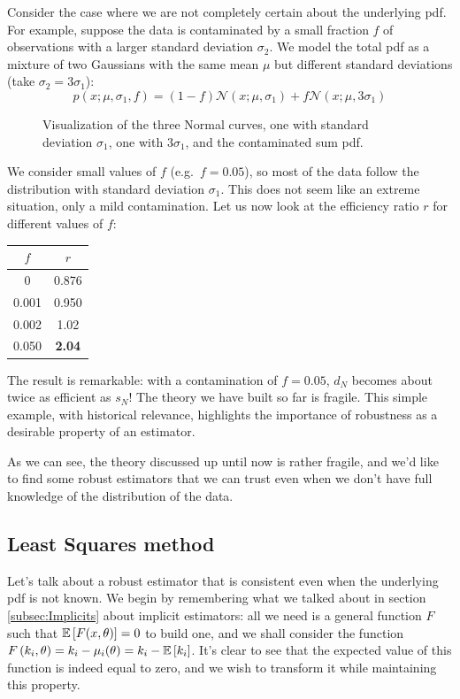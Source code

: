 \begin{example}
	Consider the case where we are not completely certain about the underlying pdf. For example, suppose the data is contaminated by a small fraction $f$ of observations with a larger standard deviation $\sigma_2$.
	We model the total pdf as a mixture of two Gaussians with the same mean $\mu$ but different standard deviations (take $\sigma_2 = 3\sigma_1$):
	\[
	p(x; \mu, \sigma_1, f) = (1-f)\mathcal{N}(x;\mu,\sigma_1) + f\mathcal{N}(x;\mu, 3\sigma_1)
	\]
	\begin{figure}[H]
		\centering
		
		\caption{Visualization of the three Normal curves, one with standard deviation $\sigma_1$, one with $3\sigma_1$, and the contaminated sum pdf.}
	\end{figure}
	We consider small values of $f$ (e.g.\ $f=0.05$), so most of the data follow the distribution with standard deviation $\sigma_1$. This does not seem like an extreme situation, only a mild contamination. Let us now look at the efficiency ratio $r$ for different values of $f$:
	\begin{center}
	\begin{tabular}{||c|c||}
		\hline
		$f$ & $r$ \\
		\hline
		0 & 0.876 \\
		\hline
		0.001 & 0.950\\
		\hline
		0.002 & 1.02\\
		\hline
		0.050 & \textbf{2.04}\\
		\hline
	\end{tabular}
	\end{center}
	The result is remarkable: with a contamination of $f=0.05$, $d_N$ becomes about twice as efficient as $s_N$! The theory we have built so far is fragile.
	This simple example, with historical relevance, highlights the importance of robustness as a desirable property of an estimator.
\end{example}

As we can see, the theory discussed up until now is rather fragile, and we'd like to find some robust estimators that we can trust even when we don't have full knowledge of the distribution of the data. 

\subsection{Least Squares method}
Let's talk about a robust estimator that is consistent even when the underlying pdf is not known. We begin by remembering what we talked about in section \ref{subsec:Implicits} about implicit estimators: all we need is a general function $F$ such that $\mathbb{E}\left[F(x,\theta)\right] = 0$ to build one, and we shall consider the function $F\left(k_i,\theta\right) = k_i -\mu_i(\theta) = k_i - \mathbb{E}\left[k_i\right]$. It's clear to see that the expected value of this function is indeed equal to zero, and we wish to transform it while maintaining this property.

